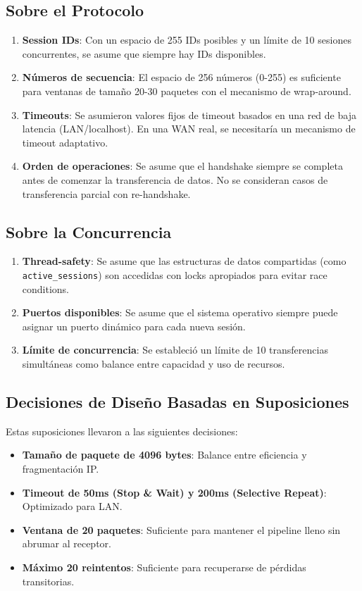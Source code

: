 \subsection{Sobre el Protocolo}
\begin{enumerate}
    \item \textbf{Session IDs}: Con un espacio de 255 IDs posibles y un límite de 10 sesiones concurrentes, se asume que siempre hay IDs disponibles.
    \item \textbf{Números de secuencia}: El espacio de 256 números (0-255) es suficiente para ventanas de tamaño 20-30 paquetes con el mecanismo de wrap-around.
    \item \textbf{Timeouts}: Se asumieron valores fijos de timeout basados en una red de baja latencia (LAN/localhost). En una WAN real, se necesitaría un mecanismo de timeout adaptativo.
    \item \textbf{Orden de operaciones}: Se asume que el handshake siempre se completa antes de comenzar la transferencia de datos. No se consideran casos de transferencia parcial con re-handshake.
\end{enumerate}

\subsection{Sobre la Concurrencia}
\begin{enumerate}
    \item \textbf{Thread-safety}: Se asume que las estructuras de datos compartidas (como \texttt{active\_sessions}) son accedidas con locks apropiados para evitar race conditions.
    \item \textbf{Puertos disponibles}: Se asume que el sistema operativo siempre puede asignar un puerto dinámico para cada nueva sesión.
    \item \textbf{Límite de concurrencia}: Se estableció un límite de 10 transferencias simultáneas como balance entre capacidad y uso de recursos.
\end{enumerate}

\subsection{Decisiones de Diseño Basadas en Suposiciones}
Estas suposiciones llevaron a las siguientes decisiones:
\begin{itemize}
    \item \textbf{Tamaño de paquete de 4096 bytes}: Balance entre eficiencia y fragmentación IP.
    \item \textbf{Timeout de 50ms (Stop \& Wait) y 200ms (Selective Repeat)}: Optimizado para LAN.
    \item \textbf{Ventana de 20 paquetes}: Suficiente para mantener el pipeline lleno sin abrumar al receptor.
    \item \textbf{Máximo 20 reintentos}: Suficiente para recuperarse de pérdidas transitorias.
\end{itemize}



